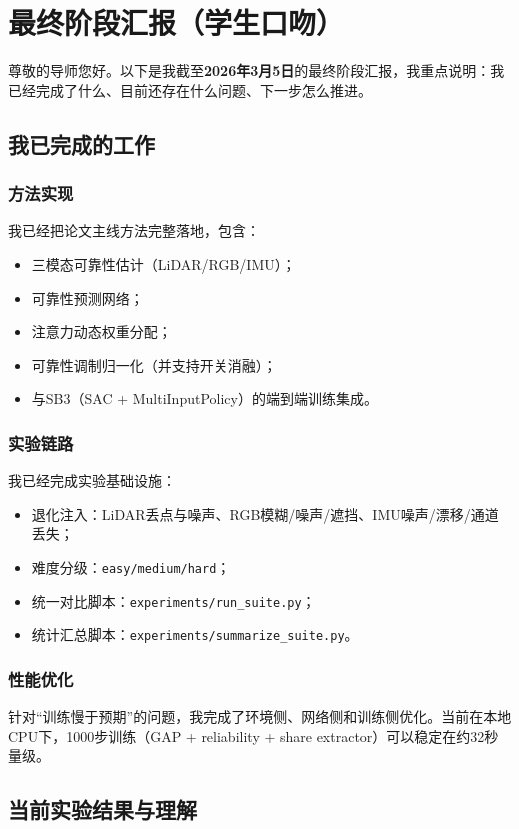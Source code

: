 \chapter{最终阶段汇报（学生口吻）}
\label{appendix-final-student-report}

尊敬的导师您好。以下是我截至\textbf{2026年3月5日}的最终阶段汇报，我重点说明：我已经完成了什么、目前还存在什么问题、下一步怎么推进。

\section{我已完成的工作}
\subsection{方法实现}
我已经把论文主线方法完整落地，包含：
\begin{itemize}
    \item 三模态可靠性估计（LiDAR/RGB/IMU）；
    \item 可靠性预测网络；
    \item 注意力动态权重分配；
    \item 可靠性调制归一化（并支持开关消融）；
    \item 与SB3（SAC + MultiInputPolicy）的端到端训练集成。
\end{itemize}

\subsection{实验链路}
我已经完成实验基础设施：
\begin{itemize}
    \item 退化注入：LiDAR丢点与噪声、RGB模糊/噪声/遮挡、IMU噪声/漂移/通道丢失；
    \item 难度分级：\texttt{easy/medium/hard}；
    \item 统一对比脚本：\texttt{experiments/run\_suite.py}；
    \item 统计汇总脚本：\texttt{experiments/summarize\_suite.py}。
\end{itemize}

\subsection{性能优化}
针对“训练慢于预期”的问题，我完成了环境侧、网络侧和训练侧优化。当前在本地CPU下，1000步训练（GAP + reliability + share extractor）可以稳定在约32秒量级。

\section{当前实验结果与理解}
